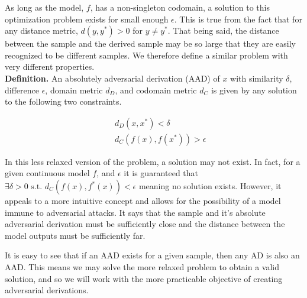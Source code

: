 As long as the model, $f$, has a non-singleton codomain, a solution to this optimization problem exists for small enough $\epsilon$.  This is true from the fact that for any distance metric, $d(y,y^*) > 0$ for $y \neq y^*$.  That being said, the distance between the sample and the derived sample may be so large that they are easily recognized to be different samples.  We therefore define a similar problem with very different properties.\\

\noindent
\textbf{Definition.} An absolutely adversarial derivation (AAD) of $x$ with similarity $\delta$, difference $\epsilon$, domain metric $d_D$, and codomain metric $d_C$ is given by any solution to the following two constraints.

\begin{equation*}
\begin{aligned}
& & d_D(x,x^*) < \delta\\
& & d_C(f(x),f(x^*)) > \epsilon
\end{aligned}
\end{equation*}

In this less relaxed version of the problem, a solution may not exist.  In fact, for a given continuous model $f$, and $\epsilon$ it is guaranteed that $\exists \delta > 0 \text{ s.t. } d_C(f(x),f^*(x)) < \epsilon$ meaning no solution exists.  However, it appeals to a more intuitive concept and allows for the possibility of a model immune to adversarial attacks.  It says that the sample and it's absolute adversarial derivation must be sufficiently close and the distance between the model outputs must be sufficiently far.  

It is easy to see that if an AAD exists for a given sample, then any AD is also an AAD.  This means we may solve the more relaxed problem to obtain a valid solution, and so we will work with the more practicable objective of creating adversarial derivations.
